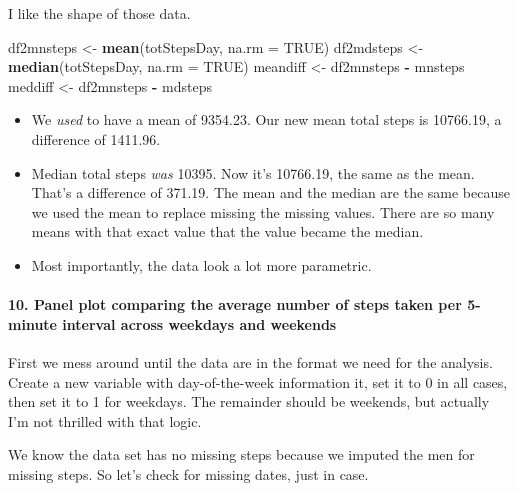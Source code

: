 \documentclass[]{article}
\newenvironment{Shaded}{\begin{snugshade}}{\end{snugshade}}
\newcommand{\KeywordTok}[1]{\textcolor[rgb]{0.13,0.29,0.53}{\textbf{#1}}}
\newcommand{\DataTypeTok}[1]{\textcolor[rgb]{0.13,0.29,0.53}{#1}}
\newcommand{\StringTok}[1]{\textcolor[rgb]{0.31,0.60,0.02}{#1}}
\newcommand{\OtherTok}[1]{\textcolor[rgb]{0.56,0.35,0.01}{#1}}
\newcommand{\OperatorTok}[1]{\textcolor[rgb]{0.81,0.36,0.00}{\textbf{#1}}}
\newcommand{\NormalTok}[1]{#1}
\providecommand{\tightlist}{%
  \setlength{\itemsep}{0pt}\setlength{\parskip}{0pt}}
\let\oldparagraph\paragraph
\renewcommand{\paragraph}[1]{\oldparagraph{#1}\mbox{}}
\begin{document}
I like the shape of those data.

\begin{Shaded}
\begin{Highlighting}[]
\NormalTok{df2mnsteps <-}\StringTok{ }\KeywordTok{mean}\NormalTok{(totStepsDay, }\DataTypeTok{na.rm =} \OtherTok{TRUE}\NormalTok{)}
\NormalTok{df2mdsteps <-}\StringTok{ }\KeywordTok{median}\NormalTok{(totStepsDay, }\DataTypeTok{na.rm =} \OtherTok{TRUE}\NormalTok{)}
\NormalTok{meandiff <-}\StringTok{ }\NormalTok{df2mnsteps }\OperatorTok{-}\StringTok{ }\NormalTok{mnsteps}
\NormalTok{meddiff <-}\StringTok{ }\NormalTok{df2mnsteps }\OperatorTok{-}\StringTok{ }\NormalTok{mdsteps}
\end{Highlighting}
\end{Shaded}

\begin{itemize}
\tightlist
\item
  We \emph{used} to have a mean of 9354.23. Our new mean total steps is
  10766.19, a difference of 1411.96.\\
\item
  Median total steps \emph{was} 10395. Now it's 10766.19, the same as
  the mean. That's a difference of 371.19. The mean and the median are
  the same because we used the mean to replace missing the missing
  values. There are so many means with that exact value that the value
  became the median.\\
\item
  Most importantly, the data look a lot more parametric.
\end{itemize}

\paragraph{10. Panel plot comparing the average number of steps taken
per 5-minute interval across weekdays and
weekends}\label{panel-plot-comparing-the-average-number-of-steps-taken-per-5-minute-interval-across-weekdays-and-weekends}

First we mess around until the data are in the format we need for the
analysis. Create a new variable with day-of-the-week information it, set
it to 0 in all cases, then set it to 1 for weekdays. The remainder
should be weekends, but actually I'm not thrilled with that logic.

We know the data set has no missing steps because we imputed the men for
missing steps. So let's check for missing dates, just in case.
\end{document}
